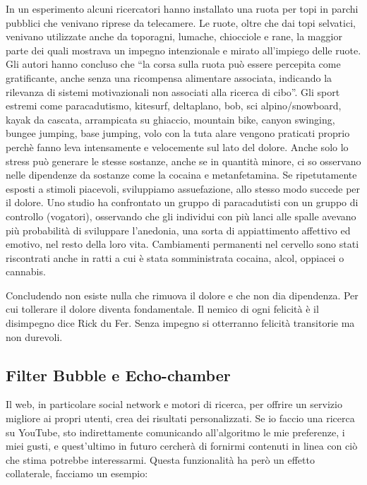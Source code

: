 \documentclass[12pt]{book} %
\begin{document}
\begin{mdframed}[linewidth=1pt]
In un esperimento alcuni
ricercatori hanno installato una ruota per topi in parchi pubblici che venivano riprese da telecamere. Le ruote, oltre
che dai topi selvatici, venivano utilizzate anche da toporagni, lumache, chiocciole e rane, la maggior parte dei quali
mostrava un impegno intenzionale e mirato all'impiego delle ruote. Gli autori hanno concluso che
“la corsa sulla ruota può essere percepita come gratificante, anche senza una ricompensa alimentare associata,
indicando la rilevanza di sistemi motivazionali non associati alla ricerca di cibo”. Gli sport estremi come
paracadutismo, kitesurf, deltaplano, bob, sci alpino/snowboard, kayak da cascata, arrampicata su ghiaccio, mountain
bike, canyon swinging, bungee jumping, base jumping, volo con la tuta alare vengono praticati proprio perchè fanno leva
intensamente e velocemente sul lato del dolore. Anche solo lo stress può generare le stesse sostanze, anche se in
quantità minore, ci so osservano nelle dipendenze da sostanze come la cocaina e metanfetamina. Se ripetutamente esposti a stimoli piacevoli, sviluppiamo assuefazione, allo stesso modo succede per il dolore. Uno
studio ha confrontato un gruppo di paracadutisti con un gruppo di controllo (vogatori), osservando che gli individui
con più lanci alle spalle avevano più probabilità di sviluppare l'anedonia, una sorta di
appiattimento affettivo ed emotivo, nel resto della loro vita. Cambiamenti permanenti nel cervello sono stati
riscontrati anche in ratti a cui è stata somministrata cocaina, alcol, oppiacei o cannabis. 

Concludendo non esiste nulla che rimuova il dolore e che non dia dipendenza. Per cui tollerare il dolore diventa
fondamentale. Il nemico di ogni felicità è il disimpegno dice Rick du Fer. Senza impegno si otterranno felicità
transitorie ma non durevoli.
\end{mdframed}

\subsection[Filter Bubble e Echo{}-chamber]{Filter Bubble e Echo-chamber}
Il web, in particolare social network e motori di ricerca, per offrire un servizio migliore ai propri utenti, crea dei
risultati personalizzati. Se io faccio una ricerca su YouTube, sto indirettamente comunicando
all'algoritmo le mie preferenze, i miei gusti, e quest'ultimo in futuro
cercherà di fornirmi contenuti in linea con ciò che stima potrebbe interessarmi. Questa funzionalità ha però un effetto
collaterale, facciamo un esempio:
\end{document}
